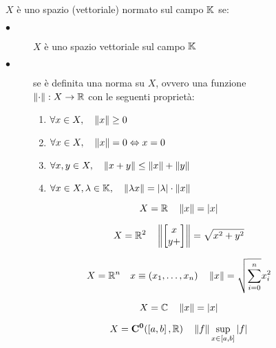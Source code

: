 $X$ è uno spazio (vettoriale) normato sul campo $\mathbb{K}$ se:
\begin{description}
	\item[$\bullet$] $X$ è uno spazio vettoriale sul campo $\mathbb{K}$
	\item[$\bullet$] se è definita una norma su $X$, ovvero una funzione\\
	$\left\|\cdot\right\|:X\to\mathbb{R}$ con le seguenti proprietà:
	\begin{enumerate}
		\item $\forall x\in X,\quad\left\|x\right\|\ge0$
		\item $\forall x\in X,\quad\left\|x\right\|=0\Leftrightarrow x=0$
		\item $\forall x,y\in X,\quad\left\|x+y\right\|\le\left\|x\right\|+\left\|y\right\|$
		\item $\forall x\in X,\lambda\in\mathbb{K},\quad\left\|\lambda x\right\|=\left|\lambda\right|\cdot\left\|x\right\|$
	\end{enumerate}
\end{description}

\begin{example}
$$X=\mathbb{R}\quad\left\|x\right\|=\left|x\right|$$
\end{example}
\begin{example}
	$$X=\mathbb{R}^{2}\quad\left\|\left[\begin{matrix}x\\y+\end{matrix}\right]\right\|=\sqrt{x^2+y^2}$$
\end{example}
\begin{example}
	$$X=\mathbb{R}^{n}\quad x\equiv(x_1,\ldots,x_n)\quad \left\|x\right\|=\sqrt{\sum\limits_{i=0}^n}x_i^2$$
\end{example}
\begin{example}
	$$X=\mathbb{C}\quad\left\|x\right\|=\left|x\right|$$
\end{example}
\begin{example}
	$$X=\mathbf{C^{0}}(\left[a,b\right],\mathbb{R})\quad\left\|f\right\|\sup\limits_{x\in\left[a,b\right]}\left|f\right|$$
\end{example}

